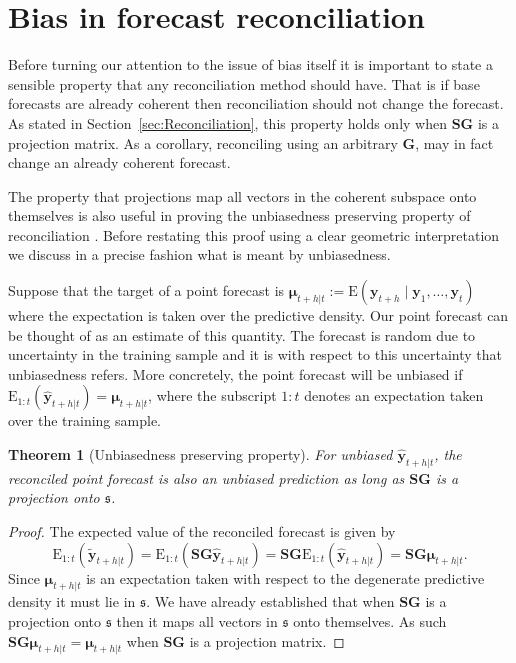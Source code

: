 \documentclass[12pt]{article}
\def\E{\text{E}}
\newtheorem{theo}{Theorem}[section]
\theoremstyle{definition}
\theoremstyle{property}
\begin{document}
	
	\section{Bias in forecast reconciliation}\label{sec:BiasInRecon}
	
	Before turning our attention to the issue of bias itself it is important to state a sensible property that any reconciliation method should have.  That is if base forecasts are already coherent then reconciliation should not change the forecast.  As stated in Section~\ref{sec:Reconciliation}, this property holds only when $\bm{SG}$ is a projection matrix.  As a corollary, reconciling using an arbitrary $\bm{G}$,  may in fact change an already coherent forecast.  
	
	The property that projections map all vectors in the coherent subspace onto themselves is also useful in proving the unbiasedness preserving property of reconciliation \cite{WicEtAl2019}.  Before restating this proof using a  clear geometric interpretation we discuss in a precise fashion what is meant by unbiasedness.  
	
	Suppose that the target of a point forecast is $\bm{\mu}_{t+h|t}:=\E(\bm{y}_{t+h}\mid\bm{y}_{1},\dots,\bm{y}_{t})$ where the expectation is taken over the predictive density.  Our point forecast can be thought of as an estimate of this quantity.  The forecast is random due to uncertainty in the training sample and it is with respect to this uncertainty that unbiasedness refers.  More concretely, the point forecast will be unbiased if $\E_{1:t}(\hat{\bm{y}}_{t+h|t})=\bm{\mu}_{t+h|t}$, where the subscript $1:t$ denotes an expectation taken over the training sample.
	
	\begin{theo}[Unbiasedness preserving property]
		For unbiased $\hat{\bm{y}}_{t+h|t}$, the reconciled point forecast is also an unbiased prediction as long as $\bm{SG}$ is a projection onto $\mathfrak{s}$.
	\end{theo}
	\begin{proof}
		The expected value of the reconciled forecast is given by
		\[
		\E_{1:t}(\tilde{\bm{y}}_{t+h|t})
		= \E_{1:t}(\bm{S}\bm{G}\hat{\bm{y}}_{t+h|t})
		= \bm{S}\bm{G}\E_{1:t}(\hat{\bm{y}}_{t+h|t})
		= \bm{S}\bm{G}\bm{\mu}_{t+h|t}.
		\]
		Since $\bm{\mu}_{t+h|t}$ is an expectation taken with respect to the degenerate predictive density it must lie in $\mathfrak{s}$. We have already established that when $\bm{S}\bm{G}$ is a projection onto $\mathfrak{s}$ then it maps all vectors in $\mathfrak{s}$ onto themselves. As such $\bm{S}\bm{G}\bm{\mu}_{t+h|t}=\bm{\mu}_{t+h|t}$ when $\bm{S}\bm{G}$ is a projection matrix.
	\end{proof}
\end{document}
